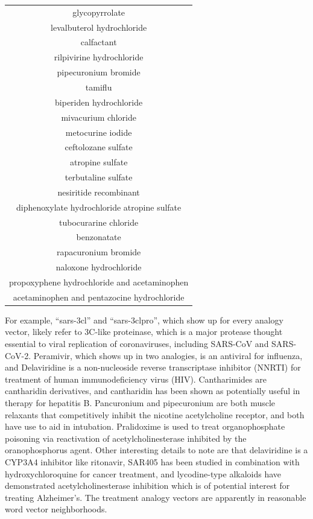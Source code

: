 \documentclass{article}
\newcommand{\lgc}[1]{\cellcolor[gray]{0.85}#1}
\begin{document}
\begin{table}[p]
\begin{tabular}[t]{c}
\lgc{glycopyrrolate\cite{garg2020can}} \\
levalbuterol hydrochloride \\
calfactant \\
rilpivirine hydrochloride \\
pipecuronium bromide \\
tamiflu \\
biperiden hydrochloride \\
mivacurium chloride \\
metocurine iodide \\
ceftolozane sulfate \\
atropine sulfate \\
terbutaline sulfate \\
nesiritide recombinant \\
diphenoxylate hydrochloride atropine sulfate \\
tubocurarine chloride \\
benzonatate \\
rapacuronium bromide \\
naloxone hydrochloride \\
propoxyphene hydrochloride and acetaminophen \\
acetaminophen and pentazocine hydrochloride \\
\hline
\end{tabular}
\end{table}

For example, ``sars-3cl'' and ``sars-3clpro'', which show up for every analogy vector, likely refer to 3C-like proteinase, which is a major protease thought essential to viral replication of coronaviruses, including SARS-CoV and SARS-CoV-2\cite{goetz2007substrate,zhang2020crystal}.
Peramivir, which shows up in two analogies, is an antiviral for influenza, and Delaviridine is a non-nucleoside reverse transcriptase inhibitor (NNRTI) for treatment of human immunodeficiency virus (HIV).
Cantharimides are cantharidin derivatives, and cantharidin has been shown as potentially useful in therapy for hepatitis B\cite{romero2007effect}.
Pancuronium and pipecuronium are both muscle relaxants that competitively inhibit the nicotine acetylcholine receptor, and both have use to aid in intubation\cite{speight1972pancuronium,buniatian2004new}.
Pralidoxime is used to treat organophosphate poisoning via reactivation of acetylcholinesterase inhibited by the oranophosphorus agent\cite{jokanovic2009pyridinium}.
Other interesting details to note are that delaviridine is a CYP3A4 inhibitor\cite{famil2006guidelines} like ritonavir, SAR405 has been studied in combination with hydroxychloroquine for cancer treatment\cite{shi2017research}, and lycodine-type alkaloids have demonstrated acetylcholinesterase inhibition which is of potential interest for treating Alzheimer's\cite{zhang2014lycodine}.
The treatment analogy vectors are apparently in reasonable word vector neighborhoods.
\end{document}
